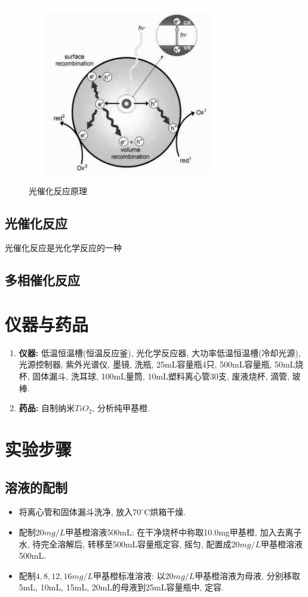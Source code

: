 \documentclass[a4paper]{article}
\begin{document}
\begin{figure}[H]
	\centering
	\includegraphics[width = 0.5\paperwidth]{fig/principle.png}
	\caption{光催化反应原理}
\end{figure}
\par
\subsection{光催化反应}
光催化反应是光化学反应的一种

\subsection{多相催化反应}

\section{仪器与药品}
\begin{enumerate}
    \item \textbf{仪器:} 低温恒温槽(恒温反应釜), 光化学反应器, 大功率低温恒温槽(冷却光源), 
	光源控制器, 紫外光谱仪, 墨镜, 洗瓶, 25mL容量瓶4只, 500mL容量瓶, 
	50mL烧杯, 固体漏斗, 洗耳球, 100mL量筒, 10mL塑料离心管30支, 废液烧杯, 滴管, 玻棒.
    \item \textbf{药品:} 自制纳米$TiO_{2}$, 分析纯甲基橙.
\end{enumerate}
\section{实验步骤}
\subsection{溶液的配制}
\begin{itemize}
	\item 将离心管和固体漏斗洗净, 放入$70^\circ$C烘箱干燥.
	\item 配制$20mg/L$甲基橙溶液500mL: 在干净烧杯中称取10.0mg甲基橙, 
	加入去离子水, 待完全溶解后, 转移至500mL容量瓶定容, 摇匀, 配置成$20mg/L$甲基橙溶液500mL.
	\item 配制$4, 8, 12, 16mg/L$甲基橙标准溶液: 以$20mg/L$甲基橙溶液为母液, 分别移取5mL, 
	10mL, 15mL, 20mL的母液到25mL容量瓶中, 定容.
\end{itemize}
\end{document}
